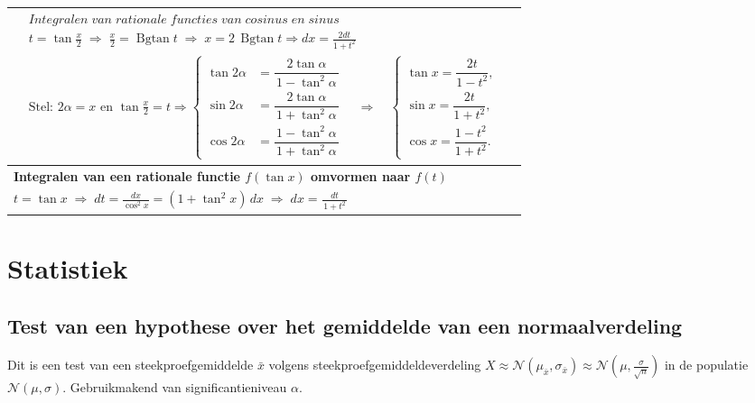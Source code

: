 \documentclass[a5paper]{article}
\begin{document}
\begin{tabular}{|p{0.98\linewidth}|}
$\begin{aligned}
&Integralen\;van\;rationale\;functies\;van\;cosinus\;en\;sinus \\
&t=\tan\frac{x}{2}\;\Rightarrow\;\frac{x}{2}=\operatorname{Bgtan}t
\;\Rightarrow\;x=2\,\operatorname{Bgtan}t \Rightarrow \boxed{dx = \frac{{2dt}}{{1 + {t^2}}}}\\[4pt]
&\text{Stel: }2\alpha=x \text{ en } \tan\frac{x}{2}=t \Rightarrow
\left\{
\begin{aligned}
\tan 2\alpha&=\dfrac{2\tan\alpha}{\,1-\tan^{2}\alpha\,}\\[6pt]
\sin 2\alpha&=\dfrac{2\tan\alpha}{\,1+\tan^{2}\alpha\,}\\[6pt]
\cos 2\alpha&=\dfrac{1-\tan^{2}\alpha}{\,1+\tan^{2}\alpha\,}
\end{aligned}\right.
\quad\Rightarrow\quad
\boxed{
\begin{cases}
\displaystyle \tan x=\dfrac{2t}{1-t^{2}},\\[8pt]
\displaystyle \sin x=\dfrac{2t}{1+t^{2}},\\[8pt]
\displaystyle \cos x=\dfrac{1-t^{2}}{1+t^{2}}.
\end{cases}
}
\end{aligned}$
\\
\hline

\textbf{Integralen van een rationale functie $f(\tan x)$ omvormen naar $f(t)$}
\\[2pt]
$\displaystyle
t=\tan x \;\Rightarrow\; dt=\frac{dx}{\cos^{2}x}=(1+\tan^{2}x)\,dx
\;\Rightarrow\; dx=\frac{dt}{\,1+t^{2}\,}
$
\\
\hline
\end{tabular}


\newpage

\section{Statistiek}
\subsection{Test van een hypothese over het gemiddelde van een normaalverdeling}

\begin{flushleft}
{Dit is een test van een steekproefgemiddelde $\bar{x}$ volgens steekproefgemiddeldeverdeling $X \approx \mathcal{N}({\mu _{\bar x}}, {\sigma _{\bar x}} ) \approx \mathcal{N}(\mu, \frac{\sigma}{\sqrt{n}}) $ in de populatie $\mathcal{N}(\mu, \sigma)$}. Gebruikmakend van significantieniveau $\alpha$.
\end{flushleft}
\end{document}
